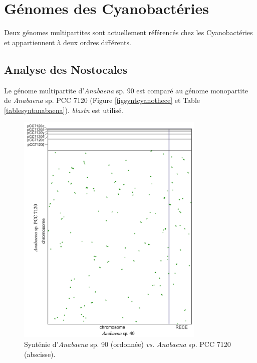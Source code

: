 \newpage
\section{Génomes des Cyanobactéries}
	Deux génomes multipartites sont actuellement référencés chez les Cyanobactéries et appartiennent à deux ordres différents.     

\subsection{Analyse des Nostocales}\label{paranab}
   Le génome multipartite d'\textit{Anabaena} sp. 90 est comparé au génome monopartite de \textit{Anabaena} sp. PCC 7120 (Figure \ref{figsyntcyanothece} et Table \ref{tablesyntanabaena}). \textit{blastn} est utilisé. 

\begin{figure}[H]
   \begin{center}
   	\includegraphics[width=0.8\textwidth]{./img/synteny/new/fig8_13.png}
   	\caption[Synténie entre espèces multi-/monopartite d'\textit{Anabaena}]{Synténie d'\textit{Anabaena} sp. 90 (ordonnée) \textit{vs.} \textit{Anabaena} sp. PCC 7120 (abscisse).}\label{figsyntanabaena}
   \end{center}
\end{figure}   

